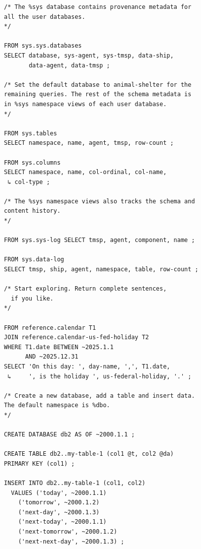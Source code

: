 \documentclass[twoside]{article}
\begin{document}
\begin{lstlisting}[style=listingcode_sql]
/* The %sys database contains provenance metadata for
all the user databases.
*/

FROM sys.sys.databases
SELECT database, sys-agent, sys-tmsp, data-ship,
       data-agent, data-tmsp ;

/* Set the default database to animal-shelter for the
remaining queries. The rest of the schema metadata is
in %sys namespace views of each user database.
*/

FROM sys.tables
SELECT namespace, name, agent, tmsp, row-count ;

FROM sys.columns
SELECT namespace, name, col-ordinal, col-name,
 ↳ col-type ;

/* The %sys namespace views also tracks the schema and
content history.
*/

FROM sys.sys-log SELECT tmsp, agent, component, name ;

FROM sys.data-log
SELECT tmsp, ship, agent, namespace, table, row-count ;

/* Start exploring. Return complete sentences,
  if you like.
*/

FROM reference.calendar T1
JOIN reference.calendar-us-fed-holiday T2
WHERE T1.date BETWEEN ~2025.1.1
      AND ~2025.12.31
SELECT 'On this day: ', day-name, ',', T1.date,
 ↳     ', is the holiday ', us-federal-holiday, '.' ;

/* Create a new database, add a table and insert data.
The default namespace is %dbo.
*/

CREATE DATABASE db2 AS OF ~2000.1.1 ;

CREATE TABLE db2..my-table-1 (col1 @t, col2 @da)
PRIMARY KEY (col1) ;

INSERT INTO db2..my-table-1 (col1, col2)
  VALUES ('today', ~2000.1.1)
    ('tomorrow', ~2000.1.2)
    ('next-day', ~2000.1.3)
    ('next-today', ~2000.1.1)
    ('next-tomorrow', ~2000.1.2)
    ('next-next-day', ~2000.1.3) ;
\end{lstlisting}

\printbibliography
\end{document}
